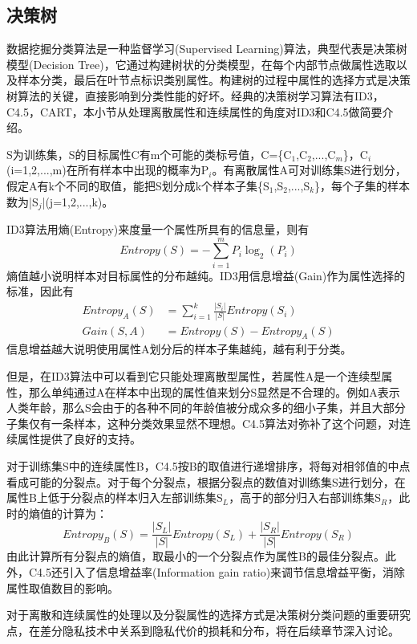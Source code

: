 \subsection{决策树} %

数据挖掘分类算法是一种监督学习(Supervised Learning)算法，典型代表是决策树模型(Decision Tree)\cite{decision tree}，它通过构建树状的分类模型，在每个内部节点做属性选取以及样本分类，最后在叶节点标识类别属性。构建树的过程中属性的选择方式是决策树算法的关键，直接影响到分类性能的好坏。经典的决策树学习算法有ID3\cite{decision tree}，C4.5\cite{c45}，CART\cite{cart}，本小节从处理离散属性和连续属性的角度对ID3和C4.5做简要介绍。

\begin{exmp}
	S为训练集，S的目标属性C有m个可能的类标号值，C=\{C$_{1}$,C$_{2}$,...,C$_{m}$\}，C$_{i}$(i=1,2,...,m)在所有样本中出现的概率为P$_{i}$。有离散属性A可对训练集S进行划分，假定A有k个不同的取值，能把S划分成k个样本子集\{S$_{1}$,S$_{2}$,...,S$_{k}$\}，每个子集的样本数为|S$_{j}$|(j=1,2,...,k)。
\end{exmp}
ID3算法用熵(Entropy)来度量一个属性所具有的信息量，则有
\[
	Entropy(S) = -\sum_{i=1}^{m}P_{i}\log_{2}(P_{i})
\]
熵值越小说明样本对目标属性的分布越纯。ID3用信息增益(Gain)作为属性选择的标准，因此有
\[
\begin{split}
	Entropy_{A}(S) &= \sum_{i=1}^{k}\frac{|S_{i}|}{|S|}Entropy(S_{i})\\
	Gain(S,A) &= Entropy(S)-Entropy_{A}(S)
\end{split}
\]
信息增益越大说明使用属性A划分后的样本子集越纯，越有利于分类。

但是，在ID3算法中可以看到它只能处理离散型属性，若属性A是一个连续型属性，那么单纯通过A在样本中出现的属性值来划分S显然是不合理的。例如A表示人类年龄，那么S会由于的各种不同的年龄值被分成众多的细小子集，并且大部分子集仅有一条样本，这种分类效果显然不理想。C4.5算法对弥补了这个问题，对连续属性提供了良好的支持。

对于训练集S中的连续属性B，C4.5按B的取值进行递增排序，将每对相邻值的中点看成可能的分裂点。对于每个分裂点，根据分裂点的数值对训练集S进行划分，在属性B上低于分裂点的样本归入左部训练集S$_{L}$，高于的部分归入右部训练集S$_{R}$，此时的熵值的计算为：
\[
	Entropy_{B}(S) = \frac{|S_{L}|}{|S|}Entropy(S_{L})+\frac{|S_{R}|}{|S|}Entropy(S_{R})
\]
由此计算所有分裂点的熵值，取最小的一个分裂点作为属性B的最佳分裂点。此外，C4.5还引入了信息增益率(Information gain ratio)来调节信息增益平衡，消除属性取值数目的影响。

对于离散和连续属性的处理以及分裂属性的选择方式是决策树分类问题的重要研究点，在差分隐私技术中关系到隐私代价的损耗和分布，将在后续章节深入讨论。

